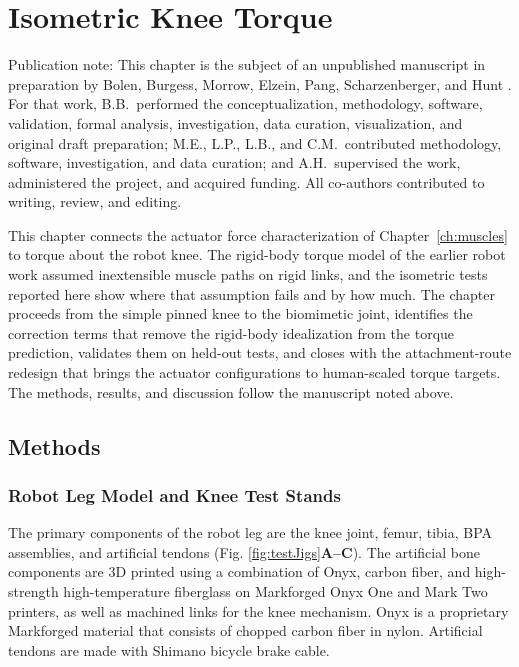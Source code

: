 \chapter{Isometric Knee Torque}\label{ch:torque}\label{ch:results}
\graphicspath{{D:/Github/Bipedal_Robot/Documentation/Reports and Papers/Dissertation/Figures/30-torque/}{figs/30-torque/}}

{\doublespacing\normalsize\upshape
\noindent Publication note: This chapter is the subject of an unpublished manuscript in preparation by Bolen, Burgess, Morrow, Elzein, Pang, Scharzenberger, and Hunt \citep{bolen_isometric_2025}. For that work, B.B.\ performed the conceptualization, methodology, software, validation, formal analysis, investigation, data curation, visualization, and original draft preparation; M.E., L.P., L.B., and C.M.\ contributed methodology, software, investigation, and data curation; and A.H.\ supervised the work, administered the project, and acquired funding. All co-authors contributed to writing, review, and editing.\par}

This chapter connects the actuator force characterization of Chapter~\ref{ch:muscles} to torque about the robot knee. The rigid-body torque model of the earlier robot work assumed inextensible muscle paths on rigid links, and the isometric tests reported here show where that assumption fails and by how much. The chapter proceeds from the simple pinned knee to the biomimetic joint, identifies the correction terms that remove the rigid-body idealization from the torque prediction, validates them on held-out tests, and closes with the attachment-route redesign that brings the actuator configurations to human-scaled torque targets. The methods, results, and discussion follow the manuscript noted above.

\section{Methods}

\subsection{Robot Leg Model and Knee Test Stands}\label{sec:robot_model}


The primary components of the robot leg are the knee joint, femur, tibia, BPA assemblies, and artificial tendons (Fig. \ref{fig:testJigs}\textbf{A--C}). The artificial bone components are 3D printed using a combination of Onyx, carbon fiber, and high-strength high-temperature fiberglass on Markforged Onyx One and Mark Two printers, as well as machined links for the knee mechanism. Onyx is a proprietary Markforged material that consists of chopped carbon fiber in nylon. Artificial tendons are made with Shimano bicycle brake cable.

